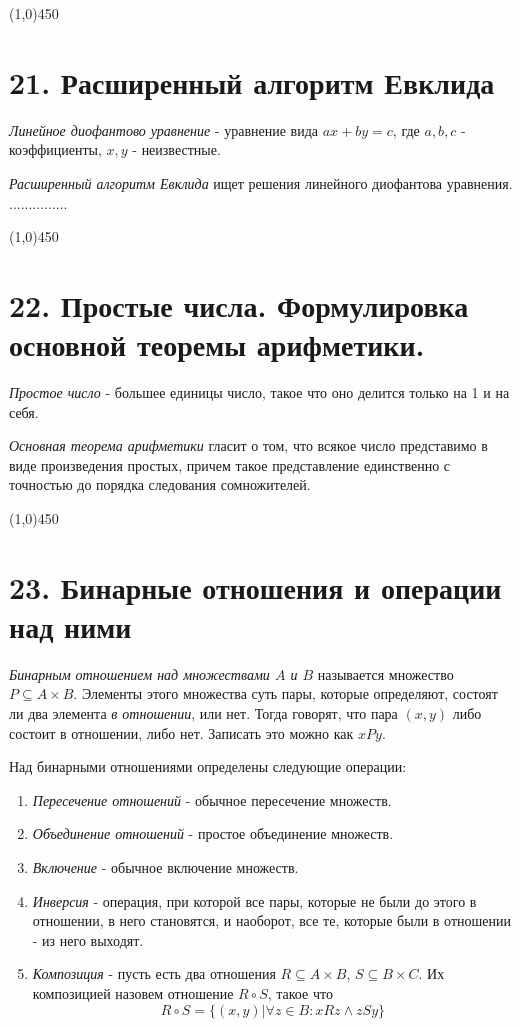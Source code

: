 \documentclass[a4paper,12pt]{article}
\begin{document}
	\begin{center}
		\line(1,0){450}
	\end{center}

	\section*{21. Расширенный алгоритм Евклида}
	\textit{Линейное диофантово уравнение} - уравнение вида $ax + by = c$, где $a, b, c$ - коэффициенты, $x, y$ - неизвестные.
	
	\textit{Расширенный алгоритм Евклида} ищет решения линейного диофантова уравнения.
	...............
	
	\begin{center}
		\line(1,0){450}
	\end{center}

	\section*{22. Простые числа. Формулировка основной теоремы арифметики.}
	\textit{Простое число} - большее единицы число, такое что оно делится только на 1 и на себя.
	
	\textit{Основная теорема арифметики} гласит о том, что всякое число представимо в виде произведения простых, причем такое представление единственно с точностью до порядка следования сомножителей.

	\begin{center}
		\line(1,0){450}
	\end{center}

	\section*{23. Бинарные отношения и операции над ними}
	\textit{Бинарным отношением над множествами $A$ и $B$} называется множество $P \subseteq A \times B$. Элементы этого множества суть пары, которые определяют, состоят ли два элемента \textit{в отношении}, или нет. Тогда говорят, что пара $(x, y)$ либо состоит в отношении, либо нет. Записать это можно как $xPy$.
	
	Над бинарными отношениями определены следующие операции:
	\begin{enumerate}
		\item \textit{Пересечение отношений} - обычное пересечение множеств.
		\item \textit{Объединение отношений} - простое объединение множеств.
		\item \textit{Включение} - обычное включение множеств.
		\item \textit{Инверсия} - операция, при которой все пары, которые не были до этого в отношении, в него становятся, и наоборот, все те, которые были в отношении - из него выходят.
		\item \textit{Композиция} - пусть есть два отношения $R \subseteq A \times B$, $S \subseteq B \times C$. Их композицией назовем отношение $R \circ S$, такое что
		\[
		R \circ S = \{(x, y) | \forall z \in B : xRz \land zSy \}
		\]
	\end{enumerate}
	
\end{document}
